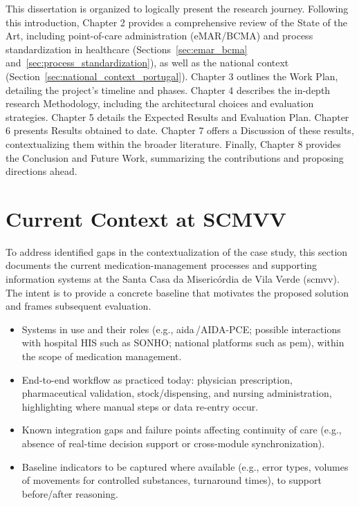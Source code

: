 This dissertation is organized to logically present the research journey. Following this introduction, Chapter 2 provides a comprehensive review of the State of the Art, including point-of-care administration (eMAR/BCMA) and process standardization in healthcare (Sections~\ref{sec:emar_bcma} and~\ref{sec:process_standardization}), as well as the national context (Section~\ref{sec:national_context_portugal}). Chapter 3 outlines the Work Plan, detailing the project's timeline and phases. Chapter 4 describes the in-depth research Methodology, including the architectural choices and evaluation strategies. Chapter 5 details the Expected Results and Evaluation Plan. Chapter 6 presents Results obtained to date. Chapter 7 offers a Discussion of these results, contextualizing them within the broader literature. Finally, Chapter 8 provides the Conclusion and Future Work, summarizing the contributions and proposing directions ahead. 

\section{Current Context at SCMVV}
\label{sec:context_scmvv}

To address identified gaps in the contextualization of the case study, this section documents the current medication-management processes and supporting information systems at the Santa Casa da Misericórdia de Vila Verde (\gls{scmvv}). The intent is to provide a concrete baseline that motivates the proposed solution and frames subsequent evaluation.

\begin{itemize}
    \item Systems in use and their roles (e.g., \gls{aida}\,/AIDA-PCE; possible interactions with hospital HIS such as SONHO; national platforms such as \gls{pem}), within the scope of medication management.
    \item End-to-end workflow as practiced today: physician prescription, pharmaceutical validation, stock/dispensing, and nursing administration, highlighting where manual steps or data re-entry occur.
    \item Known integration gaps and failure points affecting continuity of care (e.g., absence of real-time decision support or cross-module synchronization).
    \item Baseline indicators to be captured where available (e.g., error types, volumes of movements for controlled substances, turnaround times), to support before/after reasoning.
\end{itemize}

